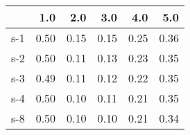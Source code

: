 \begin{tabular}{lrrrrr}
\toprule
{} &  1.0 &  2.0 &  3.0 &  4.0 &  5.0 \\
\midrule
s-1 & 0.50 & 0.15 & 0.15 & 0.25 & 0.36 \\
s-2 & 0.50 & 0.11 & 0.13 & 0.23 & 0.35 \\
s-3 & 0.49 & 0.11 & 0.12 & 0.22 & 0.35 \\
s-4 & 0.50 & 0.10 & 0.11 & 0.21 & 0.35 \\
s-8 & 0.50 & 0.10 & 0.10 & 0.21 & 0.34 \\
\bottomrule
\end{tabular}
